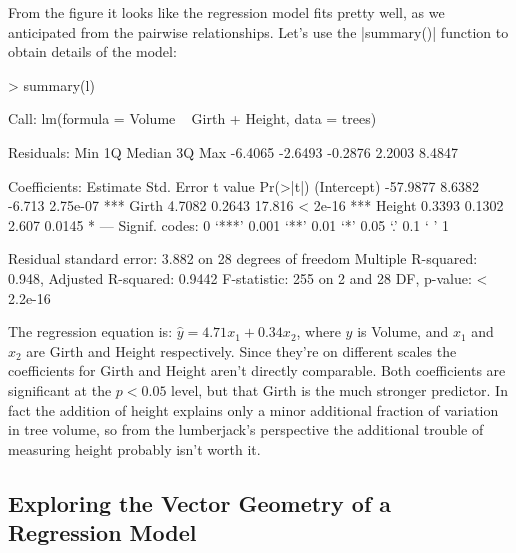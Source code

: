 From the figure it looks like the regression model fits pretty well, as we anticipated  from the pairwise relationships.  Let's use the |summary()| function to obtain details of the model:
\begin{R}
> summary(l)

Call:
lm(formula = Volume ~ Girth + Height, data = trees)

Residuals:
    Min      1Q  Median      3Q     Max
-6.4065 -2.6493 -0.2876  2.2003  8.4847

Coefficients:
            Estimate Std. Error t value Pr(>|t|)
(Intercept) -57.9877     8.6382  -6.713 2.75e-07 ***
Girth         4.7082     0.2643  17.816  < 2e-16 ***
Height        0.3393     0.1302   2.607   0.0145 *
---
Signif. codes:  0 ‘***’ 0.001 ‘**’ 0.01 ‘*’ 0.05 ‘.’ 0.1 ‘ ’ 1

Residual standard error: 3.882 on 28 degrees of freedom
Multiple R-squared: 0.948,  Adjusted R-squared: 0.9442
F-statistic:   255 on 2 and 28 DF,  p-value: < 2.2e-16
\end{R}
%
The regression equation is: $\hat{y} = 4.71x_1 + 0.34x_2$, where $y$ is Volume, and $x_1$ and $x_2$ are Girth and Height respectively. Since they're on different scales the coefficients for Girth and Height aren't directly comparable. Both coefficients are significant at the $p<0.05$ level, but that Girth is the much stronger predictor. In fact the addition of height explains only a minor additional fraction of variation in tree volume, so from the lumberjack's perspective the additional trouble of measuring height probably isn't worth it.

\subsection{Exploring the Vector Geometry of a Regression Model}


